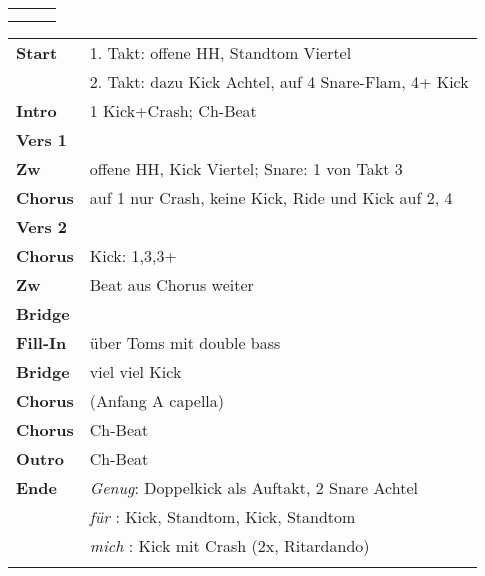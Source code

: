

\begin{tabular}{p{0.6cm}p{12cm}p{1.4cm}}
	\rowcolor{cyan} \myRow{\thesongnumber} & \myRow{Priorität} & \myRow{160} \\
	                                       &                   &             \\
\end{tabular}

\begin{tabular}{p{1.6cm}l}
	\textbf{Start}   & 1. Takt: offene HH, Standtom Viertel                   \\
	                 & 2. Takt: dazu Kick Achtel, auf 4 Snare-Flam, 4+ Kick   \\
	\textbf{Intro}   & 1 Kick+Crash; Ch-Beat                                  \\
	\textbf{Vers 1}  &                                                        \\
	\textbf{Zw}      & offene HH, Kick Viertel; Snare: 1 von Takt 3           \\
	\textbf{Chorus}  & auf 1 nur Crash, keine Kick, Ride und Kick auf 2, 4    \\
	\textbf{Vers 2}  &                                                        \\
	\textbf{Chorus}  & Kick: 1,3,3+                                           \\
	\textbf{Zw}      & Beat aus Chorus weiter                                 \\
	\textbf{Bridge}  &                                                        \\
	\textbf{Fill-In} & \sechzehntel über Toms mit double bass                 \\
	\textbf{Bridge}  & viel viel Kick                                         \\
	\textbf{Chorus}  & (Anfang A capella)                                     \\
	\textbf{Chorus}  & Ch-Beat                                                \\
	\textbf{Outro}   & Ch-Beat                                                \\
	\textbf{Ende}    & \textit{Genug}: Doppelkick als Auftakt, 2 Snare Achtel \\
	                 & \textit{für  }: Kick, Standtom, Kick, Standtom         \\
	                 & \textit{mich }: Kick mit Crash (2x, Ritardando)        \\
	                 &                                                        \\
\end{tabular}
